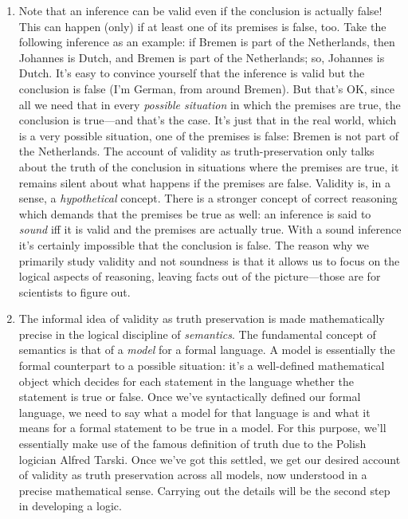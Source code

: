\begin{enumerate}[\thesection.1]
	\item Note that an inference can be valid even if the conclusion is actually false! This can happen (only) if at least one of its premises is false, too. Take the following inference as an example: if Bremen is part of the Netherlands, then Johannes is Dutch, and Bremen is part of the Netherlands; so, Johannes is Dutch. It's easy to convince yourself that the inference is valid but the conclusion is false (I'm German, from around Bremen). But that's OK, since all we need that in every \emph{possible situation} in which the premises are true, the conclusion is true---and that's the case. It's just that in the real world, which is a very possible situation, one of the premises is false: Bremen is not part of the Netherlands. The account of validity as truth-preservation only talks about the truth of the conclusion in situations where the premises are true, it remains silent about what happens if the premises are false. Validity is, in a sense, a \emph{hypothetical} concept. There is a stronger concept of correct reasoning which demands that the premises be true as well: an inference is said to \emph{sound} iff it is valid and the premises are actually true. With a sound inference it's certainly impossible that the conclusion is false. The reason why we primarily study validity and not soundness is that it allows us to focus on the logical aspects of reasoning, leaving facts out of the picture---those are for scientists to figure out.
	
	\item The informal idea of validity as truth preservation is made mathematically precise in the logical discipline of \emph{semantics}. The fundamental concept of semantics is that of a \emph{model} for a formal language. A model is essentially the formal counterpart to a possible situation: it's a well-defined mathematical object which decides for each statement in the language whether the statement is true or false. Once we've syntactically defined our formal language, we need to say what a model for that language is and what it means for a formal statement to be true in a model. For this purpose, we'll essentially make use of the famous definition of truth due to the Polish logician Alfred Tarski. Once we've got this settled, we get our desired account of validity as truth preservation across all models, now understood in a precise mathematical sense. Carrying out the details will be the second step in developing a logic. 
		

\end{enumerate}
